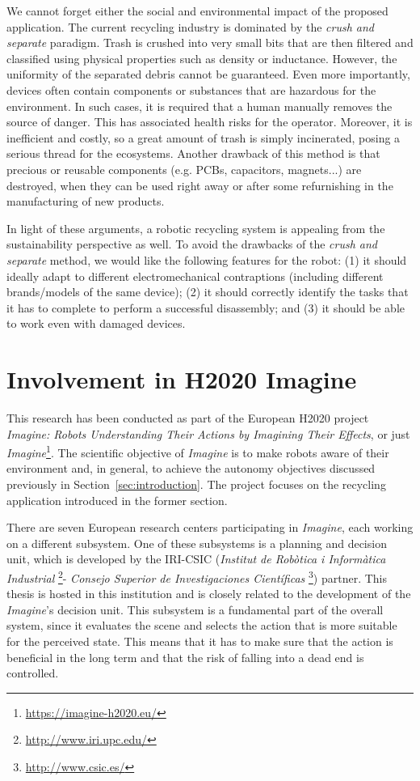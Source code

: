 \documentclass[../root.tex]{subfiles}
\begin{document}
We cannot forget either the social and environmental impact of the
proposed application. The current recycling industry is dominated
by the \emph{crush and separate} paradigm. Trash is crushed into
very small bits that are then filtered and classified using
physical properties such as density or inductance. However,
the uniformity of the separated debris cannot be guaranteed.
Even more importantly, devices often contain components or
substances that are hazardous for the environment. In such cases,
it is required that a human manually removes the source of danger.
This has associated health risks for the operator. Moreover,
it is inefficient and costly, so a great amount of trash is
simply incinerated, posing a serious thread for the ecosystems.
Another drawback of this method is that precious or reusable
components (e.g. PCBs, capacitors, magnets...) are destroyed,
when they can be used right away or after some refurnishing
in the manufacturing of new products.

In light of these arguments, a robotic recycling system is
appealing from the sustainability perspective as well.
To avoid the drawbacks of the \emph{crush and separate} method,
we would like the following features for the robot:
(1) it should
ideally adapt to different electromechanical contraptions
(including different brands/models of the same device);
(2) it should correctly identify the tasks that it
has to complete to perform a successful disassembly; and (3)
it should be able to work even with damaged devices.

\section{Involvement in H2020 Imagine}

This research has been conducted as part of the European H2020 project
\emph{Imagine: Robots Understanding Their Actions by Imagining Their Effects},
or just \emph{Imagine}\footnote{\url{https://imagine-h2020.eu/}}. The scientific
objective of \emph{Imagine} is to make robots aware of their environment
and, in general, to achieve the autonomy objectives discussed
previously in
Section~\ref{sec:introduction}. The project focuses on the recycling
application introduced in the former section.

There are seven European research centers participating in \emph{Imagine},
each working on a different subsystem. One of these subsystems is a
planning and decision unit, which is developed by the IRI-CSIC 
(\emph{Institut de Rob\`otica i Inform\`atica Industrial}%
\footnote{\url{http://www.iri.upc.edu/}}-%
\emph{Consejo Superior de Investigaciones Cient\'ificas}%
\footnote{\url{http://www.csic.es/}}) partner. This thesis is hosted
in this institution and is closely
related to the development of the \emph{Imagine}'s decision unit.
This subsystem is a fundamental part of the overall system, since it
evaluates the scene and selects the action that is more suitable for
the perceived state. This means that it has to make sure that the action
is beneficial in the long term and that the risk of falling into a
dead end is controlled.
\end{document}
